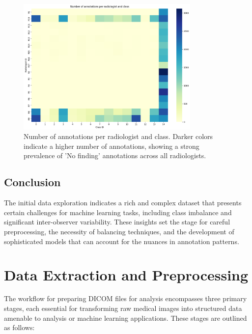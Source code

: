 \documentclass[12pt,oneside]{book} %
\begin{document}
\begin{figure}[H]
    \centering
    \includegraphics[width=0.8\textwidth]{../results/annotations_per_rad_class.png}
    \caption{Number of annotations per radiologist and class. Darker colors indicate a higher number of annotations, showing a strong prevalence of 'No finding' annotations across all radiologists.}
    \label{fig:annotations_per_rad_class}
\end{figure}

\subsection{Conclusion}
The initial data exploration indicates a rich and complex dataset that presents
certain challenges for machine learning tasks, including class imbalance and
significant inter-observer variability. These insights set the stage for
careful preprocessing, the necessity of balancing techniques, and the
development of sophisticated models that can account for the nuances in
annotation patterns.

\section{Data Extraction and Preprocessing}

The workflow for preparing DICOM files for analysis encompasses three primary
stages, each essential for transforming raw medical images into structured data
amenable to analysis or machine learning applications. These stages are
outlined as follows:
\end{document}
